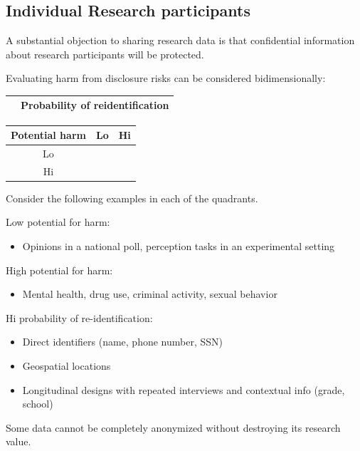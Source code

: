 \documentclass[
  english,
]{book}
\providecommand{\tightlist}{%
  \setlength{\itemsep}{0pt}\setlength{\parskip}{0pt}}
\begin{document}
\hypertarget{individual-research-participants}{%
\subsection{Individual Research participants}\label{individual-research-participants}}

A substantial objection to sharing research data is that confidential information about research participants will be protected.

Evaluating harm from disclosure risks can be considered bidimensionally:

\begin{longtable}[]{@{}lc@{}}
\toprule
& Probability of reidentification \\
\midrule
\endhead
\bottomrule
\end{longtable}

\begin{longtable}[]{@{}ccc@{}}
\toprule
Potential harm & Lo & Hi \\
\midrule
\endhead
Lo & & \\
Hi & & \\
\bottomrule
\end{longtable}

Consider the following examples in each of the quadrants.

Low potential for harm:

\begin{itemize}
\tightlist
\item
  Opinions in a national poll, perception tasks in an experimental setting
\end{itemize}

High potential for harm:

\begin{itemize}
\tightlist
\item
  Mental health, drug use, criminal activity, sexual behavior
\end{itemize}

Hi probability of re-identification:

\begin{itemize}
\tightlist
\item
  Direct identifiers (name, phone number, SSN)
\item
  Geospatial locations
\item
  Longitudinal designs with repeated interviews and contextual info (grade, school)
\end{itemize}

Some data cannot be completely anonymized without destroying its research value.
\end{document}
